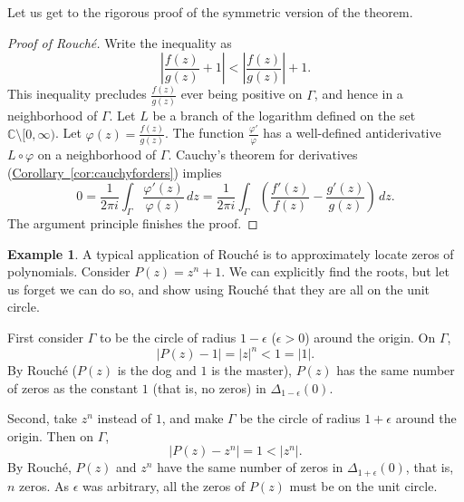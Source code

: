 \documentclass[12pt,openany]{book}
\newcommand{\sabs}[1]{\lvert {#1} \rvert}
\newcommand{\abs}[1]{\left\lvert {#1} \right\rvert}
\newcommand{\C}{{\mathbb{C}}}
\theoremstyle{plain}
\theoremstyle{remark}
\theoremstyle{definition}
\theoremstyle{exercise}
\theoremstyle{example}
\newtheorem{example}[thm]{Example}
\newcommand{\corref}[1]{\hyperref[#1]{Corollary~\ref*{#1}}}
\begin{document}
Let us get to the rigorous proof of the symmetric version of the
theorem.

\begin{proof}[Proof of Rouch\'e]
Write the inequality as
\begin{equation*}
\abs{\frac{f(z)}{g(z)} + 1} <
\abs{\frac{f(z)}{g(z)}} + 1 .
\end{equation*}
This inequality precludes $\frac{f(z)}{g(z)}$ ever being positive on
$\Gamma$, and hence in a neighborhood of $\Gamma$.  Let $L$ be a branch of
the logarithm defined on the set $\C \setminus [0,\infty)$.
Let $\varphi(z) = \frac{f(z)}{g(z)}$.
The function
$\frac{\varphi'}{\varphi}$ has a well-defined antiderivative
$L \circ \varphi$ on a neighborhood of $\Gamma$.
Cauchy's theorem for derivatives (\corref{cor:cauchyforders}) implies
\begin{equation*}
0
= \frac{1}{2\pi i} \int_{\Gamma} \frac{\varphi'(z)}{\varphi(z)} \, dz
= \frac{1}{2\pi i} \int_{\Gamma}
\left( \frac{f'(z)}{f(z)} - \frac{g'(z)}{g(z)} \right) \, dz .
\end{equation*}
The argument principle finishes the proof.
\end{proof}

\begin{example}
A typical application of Rouch\'e is to approximately locate zeros of
polynomials.  Consider $P(z) = z^n + 1$.  We can explicitly find the roots,
but let us forget we can do so,
and show using Rouch\'e that they are all on the unit circle.

First
consider $\Gamma$ to be the circle of radius $1-\epsilon$ ($\epsilon > 0$)
around the origin.  On $\Gamma$,
\begin{equation*}
\abs{P(z) - 1} = \abs{z}^n < 1 = \sabs{1}.
\end{equation*}
By Rouch\'e ($P(z)$ is the dog and $1$ is the master), $P(z)$
has the same number of zeros as the constant $1$ (that is, no zeros) in
$\Delta_{1-\epsilon}(0)$.

Second, take $z^n$ instead of $1$, and make $\Gamma$ be the circle of
radius $1+\epsilon$ around the origin.  Then on $\Gamma$,
\begin{equation*}
\abs{P(z) - z^n} = 1 < \abs{z^n} .
\end{equation*}
By Rouch\'e, $P(z)$ and $z^n$ have the same number of zeros in
$\Delta_{1+\epsilon}(0)$, that is, $n$ zeros.  As $\epsilon$ was arbitrary,
all the zeros of $P(z)$ must be on the unit circle.
\end{example}
\end{document}
